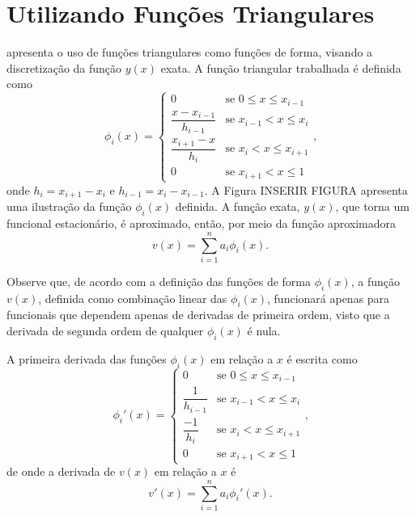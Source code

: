 \documentclass[
	12pt,				%
	openright,			%
    twoside,			%
	a4paper,			%
	english,			%
	french,				%
	spanish,			%
	brazil				%
	]{abntex2}
\numberwithin{lema}{chapter}
\numberwithin{teorema}{chapter}
\numberwithin{definicao}{chapter}
\numberwithin{exemplo}{chapter}
\numberwithin{figure}{chapter}
\begin{document}
\section{Utilizando Funções Triangulares}

 apresenta o uso de funções triangulares como funções de forma, visando a discretização da função $y(x)$ exata. A função triangular trabalhada é definida como
\begin{equation}
	\label{eqn:cap_metodo_ray_ritz:tri_func_phi}
	\phi_i (x) = 
		\begin{cases}
			0 							& \mbox{se } 0 \leqslant x \leqslant x_{i - 1}\\
			\dfrac{x-x_{i-1}}{h_{i-1}} 	& \mbox{se } x_{i-1} < x \leqslant x_i\\
			\dfrac{x_{i+1}-x}{h_i}		& \mbox{se } x_i < x \leqslant x_{i+1}\\
			0							& \mbox{se } x_{i+1}<x\leqslant 1
		\end{cases}
	\text{,}
\end{equation}
onde $h_i = x_{i+1}-x_{i}$ e $h_{i-1}=x_i-x_{i-1}$. A Figura {\color{red}INSERIR FIGURA} apresenta uma ilustração da função $\phi_i(x)$ definida. A função exata, $y(x)$, que torna um funcional estacionário, é aproximado, então, por meio da função aproximadora
\begin{equation}
	\label{eqn:cap_metodo_ray_ritz:tri_func_app_v}
	v(x)=\sum_{i=1}^{n} a_i \phi_i(x)
	\text{.}
\end{equation}

Observe que, de acordo com a definição das funções de forma $\phi_i(x)$, a função $v(x)$, definida como combinação linear das $\phi_i(x)$, funcionará apenas para funcionais que dependem apenas de derivadas de primeira ordem, visto que a derivada de segunda ordem de qualquer $\phi_i(x)$ é nula.

A primeira derivada das funções $\phi_i(x)$ em relação a $x$ é escrita como
\begin{equation}
	\label{eqn:cap_metodo_ray_ritz:tri_func_phi_diff}
	\phi_i ' (x) = 
		\begin{cases}
			0 							& \mbox{se } 0 \leqslant x \leqslant x_{i - 1}\\
			\dfrac{1}{h_{i-1}} 			& \mbox{se } x_{i-1} < x \leqslant x_i\\
			\dfrac{-1}{h_i}				& \mbox{se } x_i < x \leqslant x_{i+1}\\
			0							& \mbox{se } x_{i+1}<x\leqslant 1
		\end{cases}
	\text{,}
\end{equation}
de onde a derivada de $v(x)$ em relação a $x$ é
\begin{equation}
	v'(x)=\sum_{i=1}^{n} a_i \phi_i '(x)
	\text{.}
\end{equation}
\end{document}
